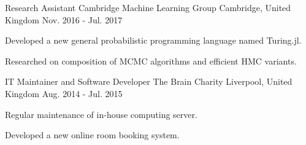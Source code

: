 

\begin{cventries}

  \cventry
    {Research Assistant} %
    {Cambridge Machine Learning Group} %
    {Cambridge, United Kingdom} %
    {Nov. 2016 - Jul. 2017} %
    {
      \begin{cvitems} %
        \item {Developed a new general probabilistic programming language named Turing.jl.}
        \item {Researched on composition of MCMC algorithms and efficient HMC variants.}
      \end{cvitems}
    }

  \cventry
    {IT Maintainer and Software Developer} %
    {The Brain Charity} %
    {Liverpool, United Kingdom} %
    {Aug. 2014 - Jul. 2015} %
    {
      \begin{cvitems} %
        \item {Regular maintenance of in-house computing server.}
        \item {Developed a new online room booking system.}
      \end{cvitems}
    }

\end{cventries}
